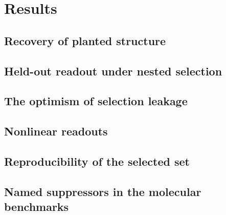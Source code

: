 \section{Results}

\subsection{Recovery of planted structure}

\subsection{Held-out readout under nested selection}

\subsection{The optimism of selection leakage}

\subsection{Nonlinear readouts}

\subsection{Reproducibility of the selected set}

\subsection{Named suppressors in the molecular benchmarks}
